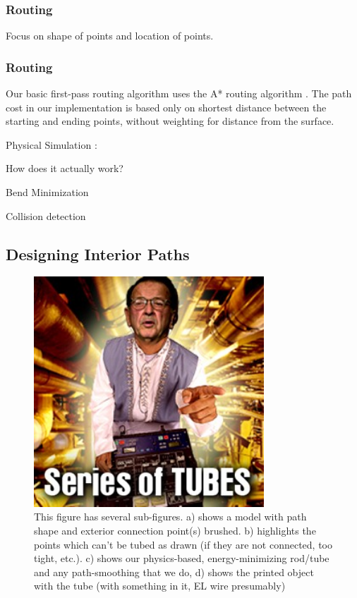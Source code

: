 \subsubsection{Routing}

Focus on shape of points and location of points.

\subsubsection{Routing}

Our basic first-pass routing algorithm uses the A* routing algorithm \cite{Hart-Astar}.  The path cost in our implementation is based only on shortest distance between the starting and ending points, without weighting for distance from the surface.

Physical Simulation : 

How does it actually work?

Bend Minimization

Collision detection

\subsection{Designing Interior Paths}

\begin{figure}[h!]
\centering
    \includegraphics[width=3.4in]{figures/series-of-tubes.jpg}
\caption{This figure has several sub-figures.  a) shows a model with path shape and exterior connection point(s) brushed.  b) highlights the points which can't be tubed as drawn (if they are not connected, too tight, etc.).  c) shows our physics-based, energy-minimizing rod/tube and any path-smoothing that we do, d) shows the printed object with the tube (with something in it, EL wire presumably)}
\label{fig:tool-process-interior}
\end{figure}

